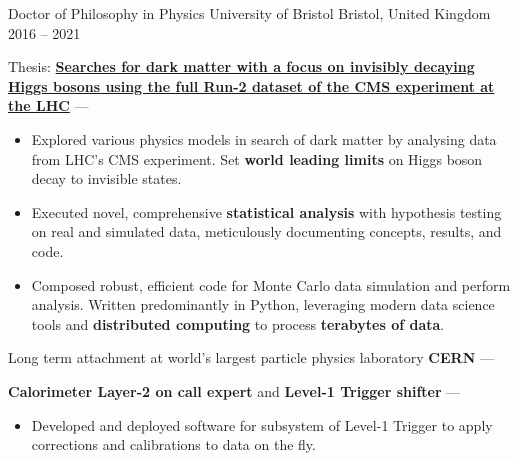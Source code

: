 
\newcommand{\vPaddingLength}{0.75mm}
\newcommand{\vpaddingEduSubpoint}{\vspace{\vPaddingLength}} %


\begin{cventries}
    \cventry
        {Doctor of Philosophy in Physics} %
        {University of Bristol} %
        {Bristol, United Kingdom} %
        {2016 -- 2021} %
        {
        \begin{cvitems} %
            \item {Thesis: \textbf{\href{https://research-information.bris.ac.uk/en/studentTheses/the-dark-side-of-the-higgs}{Searches for dark matter with a focus on invisibly decaying Higgs bosons using the full Run-2 dataset of the CMS experiment at the LHC}} --- }
            \vpaddingEduSubpoint
            \begin{itemize}[itemsep=\vPaddingLength, label=\bullet]
                \item{Explored various physics models in search of dark matter by analysing data from LHC's CMS experiment. Set \textbf{world leading limits} on Higgs boson decay to invisible states.}
                \item{Executed novel, comprehensive \textbf{statistical analysis} with hypothesis testing on real and simulated data, meticulously documenting concepts, results, and code.}
                \item{Composed robust, efficient code for Monte Carlo data simulation and perform analysis. Written predominantly in Python, leveraging modern data science tools and \textbf{distributed computing} to process \textbf{terabytes of data}.}
            \end{itemize}
            \item {Long term attachment at world's largest particle physics laboratory \textbf{CERN} --- }
            \item {\textbf{Calorimeter Layer-2 on call expert} and \textbf{Level-1 Trigger shifter} --- }
            \vpaddingEduSubpoint
            \begin{itemize}[itemsep=\vPaddingLength, label=\bullet]
                \item{Developed and deployed software for subsystem of Level-1 Trigger to apply corrections and calibrations to data on the fly.}
            \end{itemize}
        \end{cvitems}
        }


\end{cventries}

